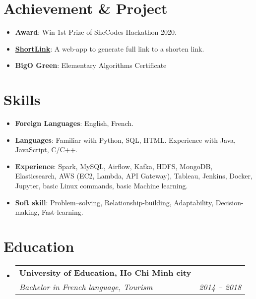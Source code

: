 \documentclass[letterpaper,11pt]{article}
\makeatletter
\newcommand{\resumeItem}[2]{
  \item\small{
    \textbf{#1}{: #2 \vspace{-2pt}}
  }
}
\newcommand{\resumeItemNornal}[1]{
  \item\small{
    {#1 \vspace{-2pt}}
  }
}
\newcommand{\resumeSubheading}[4]{
  \vspace{-1pt}
  \item
    \begin{tabular*}{0.97\textwidth}{l@{\extracolsep{\fill}}r}
      \textbf{#1} & #2 \\
      \textit{\small#3} & \textit{\small #4} \\
    \end{tabular*}\vspace{-5pt}
}
\newcommand{\resumeSubItem}[2]{\resumeItem{#1}{#2}\vspace{-4pt}}
\newcommand{\resumeSubItemNormal}[1]{\resumeItemNornal{#1}\vspace{-4pt}}
\newcommand{\resumeSubHeadingListStart}{\begin{itemize}[leftmargin=*]}
\newcommand{\resumeSubHeadingListEnd}{\end{itemize}}
\makeatother
\begin{document}
  
\section{Achievement \& Project}
  \resumeSubHeadingListStart 
    \resumeSubItem{{Award}}
      {Win 1st Prize of SheCodes Hackathon 2020. }
    \resumeSubItem{\href{https://github.com/tuyen-nnt/shortenLink}{ShortLink}}
      {A web-app to generate full link to a shorten link.}
    \resumeSubItem{BigO Green}
      {Elementary Algorithms Certificate}
\resumeSubHeadingListEnd


\section{Skills}
  \resumeSubHeadingListStart
    \resumeSubItem{Foreign Languages}
      {English, French.}
    \resumeSubItem{Languages}
      {Familiar with Python, SQL, HTML.}
      {Experience with Java, JavaScript, C/C++.}
    \resumeSubItem{Experience}
      {Spark, MySQL, Airflow, Kafka, HDFS, MongoDB, Elasticsearch, AWS (EC2, Lambda, API Gateway), Tableau, Jenkins, Docker, Jupyter, basic Linux commands, basic Machine learning.}
    \resumeSubItem{Soft skill}
      {Problem–solving, Relationship-building, Adaptability, Decision-making, Fast-learning.}
\resumeSubHeadingListEnd

\section{Education}
  \resumeSubHeadingListStart
    \resumeSubheading
      {University of Education, Ho Chi Minh city}{}
      {Bachelor in French language, Tourism}{2014 -- 2018}
  \resumeSubHeadingListEnd


\end{document}
